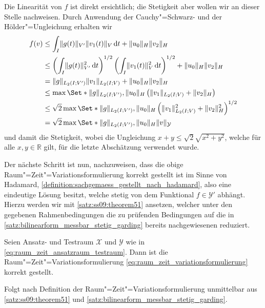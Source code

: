 \begin{Bemerkung}
\label{bemerkung:raum_zeit_variationsformulierung_rhs_stetig}
    Die Linearität von $f$ ist direkt ersichtlich; die Stetigkeit aber wollen wir an dieser Stelle nachweisen.
    Durch Anwendung der Cauchy"=Schwarz- und der Hölder"=Ungleichung erhalten wir
    \begin{equation}
        \begin{aligned}
            f(v)
            &\leq \int_{I} \norm{g(t)}_{V'} \norm{v_{1}(t)}_{V} \diff t + \norm{u_{0}}_{H} \norm{v_{2}}_{H}
            \\&\leq \left( \int_{I} \norm{g(t)}^{2}_{V'} \diff t \right)^{1/2} \left( \int_{I} \norm{v_{1}(t)}^{2}_{V} \diff t \right)^{1/2} + \norm{u_{0}}_{H} \norm{v_{2}}_{H}
            \\&= \norm{g}_{L_{2}(I; V')} \norm{v_{1}}_{L_{2}(I; V)} + \norm{u_{0}}_{H} \norm{v_{2}}_{H}
            \\&\leq \max\Set*{\norm{g}_{L_{2}(I; V')}, \norm{u_{0}}_{H}} \left( \norm{v_{1}}_{L_{2}(I; V)} + \norm{v_{2}}_{H} \right)
            \\&\leq \sqrt{2} \max\Set*{\norm{g}_{L_{2}(I; V')}, \norm{u_{0}}_{H}} \left( \norm{v_{1}}_{L_{2}(I; V)}^{2} + \norm{v_{2}}_{H}^{2} \right)^{1/2}
            \\&= \sqrt{2} \max\Set*{\norm{g}_{L_{2}(I; V')}, \norm{u_{0}}_{H}} \norm{v}_{\mathcal Y}
        \end{aligned}
    \end{equation}
    und damit die Stetigkeit, wobei die Ungleichung $x + y \leq \sqrt{2} \sqrt{x^2 + y^2}$, welche für alle $x, y \in \mathbb{R}$ gilt, für die letzte Abschätzung verwendet wurde.
\end{Bemerkung}

Der nächste Schritt ist nun, nachzuweisen, dass die obige Raum"=Zeit"=Variationsformulierung korrekt gestellt ist im Sinne von Hadamard, \cref{definition:sachgemaess_gestellt_nach_hadamard}, also eine eindeutige Lösung besitzt, welche stetig von dem Funktional $f \in \mathcal Y'$ abhängt.
Hierzu werden wir mit \cref{satz:ss09:theorem51} ansetzen, welcher unter den gegebenen Rahmenbedingungen die zu prüfenden Bedingungen auf die in \cref{satz:bilinearform_messbar_stetig_garding} bereits nachgewiesenen reduziert.

\begin{Korollar}
\label{satz:raum_zeit_variationsformulierung_sachgemaess_gestellt}
    Seien Ansatz- und Testraum $\mathcal X$ und $\mathcal Y$ wie in \cref{eq:raum_zeit_ansatzraum_testraum}.
    Dann ist die Raum"=Zeit"=Variationsformulierung \cref{eq:raum_zeit_variationsformulierung} korrekt gestellt.

    \begin{Beweis}
        Folgt nach Definition der Raum"=Zeit"=Variationsformulierung unmittelbar aus \cref{satz:ss09:theorem51} und \cref{satz:bilinearform_messbar_stetig_garding}.
    \end{Beweis}
\end{Korollar}

